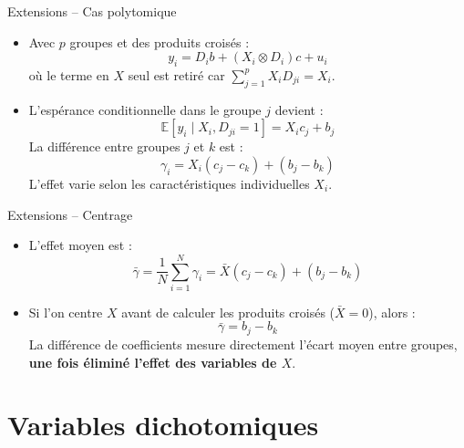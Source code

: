 \documentclass[11pt,aspectratio=169]{beamer}
\newcommand{\E}{\mathbb{E}}
\begin{document}
\begin{frame}{Extensions -- Cas polytomique}

\begin{itemize}

\item Avec $p$ groupes et des produits croisés :
  \[
  y_i = D_i b + (X_i \otimes D_i) c + u_i
  \]
  où le terme en $X$ seul est retiré car $\sum_{j=1}^{p} X_i D_{ji} = X_i$.\newline

\item L'espérance conditionnelle dans le groupe $j$ devient :
  \[
  \E[y_i \mid X_i, D_{ji} = 1] = X_i c_j + b_j
  \]
  La différence entre groupes $j$ et $k$ est :
  \[
  \gamma_i = X_i(c_j - c_k) + (b_j - b_k)
  \]
  L'effet varie selon les caractéristiques individuelles $X_i$.

\end{itemize}

\end{frame}

\begin{frame}{Extensions -- Centrage}

\begin{itemize}

\item L'effet moyen est :
  \[
  \bar{\gamma} = \frac{1}{N} \sum_{i=1}^{N} \gamma_i = \bar{X}(c_j - c_k) + (b_j - b_k)
  \]\newline

\item Si l'on centre $X$ avant de calculer les produits croisés ($\bar{X} = 0$), alors :
  \[
  \boxed{\bar{\gamma} = b_j - b_k}
  \]
  La différence de coefficients mesure directement l'écart moyen entre groupes, \textbf{une fois éliminé l'effet des variables de $X$}.

\end{itemize}

\end{frame}

\section{Variables dichotomiques}
\end{document}
